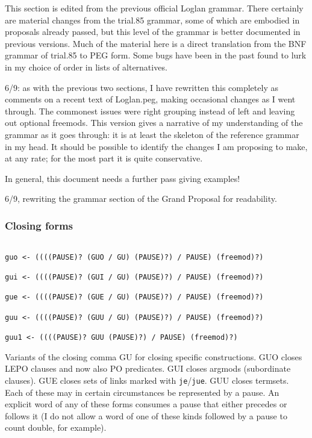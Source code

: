 \documentclass[12pt]{article}
\begin{document}
This section is edited from the previous official Loglan grammar.   There certainly are material changes from the trial.85 grammar, some of
which are embodied in proposals already passed, but this level of the grammar is better documented in previous versions.   Much of the material here is a direct translation from the BNF grammar of trial.85 to PEG form.  Some bugs have been in the past found to  lurk in my choice of order in lists of alternatives.

6/9:  as with the previous two sections, I have rewritten this completely as comments on a recent text of Loglan.peg,
making occasional changes as I went through.  The commonest issues were right grouping instead of left and leaving out
optional freemods.  This version gives a narrative of my understanding of the grammar as it goes through:  it is at least the skeleton of the reference grammar in my head.  It should be possible to identify the changes I am proposing to make, at any rate; for the most part it is quite conservative.

In general, this document needs a further pass giving examples!

6/9, rewriting the grammar section of the Grand Proposal for readability.

\subsubsection{Closing forms}

\begin{verbatim}

guo <- ((((PAUSE)? (GUO / GU) (PAUSE)?) / PAUSE) (freemod)?)

gui <- ((((PAUSE)? (GUI / GU) (PAUSE)?) / PAUSE) (freemod)?)

gue <- ((((PAUSE)? (GUE / GU) (PAUSE)?) / PAUSE) (freemod)?)

guu <- ((((PAUSE)? (GUU / GU) (PAUSE)?) / PAUSE) (freemod)?)

guu1 <- ((((PAUSE)? GUU (PAUSE)?) / PAUSE) (freemod)?)

\end{verbatim}

Variants of the closing comma GU for closing specific constructions.  GUO closes LEPO clauses and now also PO predicates.  GUI closes argmods (subordinate clauses).  GUE closes sets of links marked with {\tt je}/{\tt jue}.  GUU closes termsets.  Each of these may in certain circumstances be represented by a pause.  An explicit word of any of these forms consumes a pause that either precedes or follows it (I do not allow a word of one of these kinds followed by a pause to count double, for example).
\end{document}
